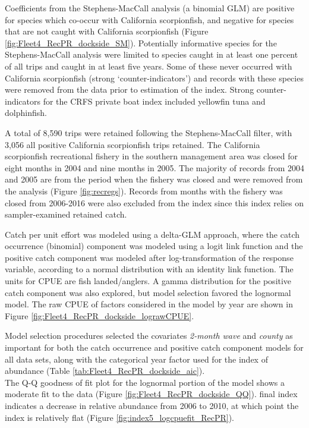 \documentclass[12pt,]{article}
\begin{document}
Coefficients from the Stephens-MacCall analysis (a binomial GLM) are
positive for species which co-occur with California scorpionfish, and
negative for species that are not caught with California scorpionfish
(Figure \ref{fig:Fleet4_RecPR_dockside_SM}). Potentially informative
species for the Stephens-MacCall analysis were limited to species caught
in at least one percent of all trips and caught in at least five years.
Some of these never occurred with California scorpionfish (strong
`counter-indicators') and records with these species were removed from
the data prior to estimation of the index. Strong counter-indicators for
the CRFS private boat index included yellowfin tuna and dolphinfish.

A total of 8,590 trips were retained following the Stephens-MacCall
filter, with 3,056 all positive California scorpionfish trips retained.
The California scorpionfish recreational fishery in the southern
management area was closed for eight months in 2004 and nine months in
2005. The majority of records from 2004 and 2005 are from the period
when the fishery was closed and were removed from the analysis (Figure
\ref{fig:recregs}). Records from months with the fishery was closed from
2006-2016 were also excluded from the index since this index relies on
sampler-examined retained catch.

Catch per unit effort was modeled using a delta-GLM approach, where the
catch occurrence (binomial) component was modeled using a logit link
function and the positive catch component was modeled after
log-transformation of the response variable, according to a normal
distribution with an identity link function. The units for CPUE are fish
landed/anglers. A gamma distribution for the positive catch component
was also explored, but model selection favored the lognormal model. The
raw CPUE of factors considered in the model by year are shown in Figure
\ref{fig:Fleet4_RecPR_dockside_lograwCPUE}.

Model selection procedures selected the covariates \emph{2-month wave}
and \emph{county} as important for both the catch occurrence and
positive catch component models for all data sets, along with the
categorical year factor used for the index of abundance (Table
\ref{tab:Fleet4_RecPR_dockside_aic}).\\
The Q-Q goodness of fit plot for the lognormal portion of the model
shows a moderate fit to the data (Figure
\ref{fig:Fleet4_RecPR_dockside_QQ}). final index indicates a decrease in
relative abundance from 2006 to 2010, at which point the index is
relatively flat (Figure \ref{fig:index5_logcpuefit_RecPR}).
\end{document}
